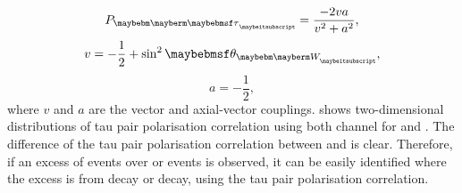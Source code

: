 \begin{equation}
P_{\Ptau} = \frac{-2va}{v^2 + a^2},
\end{equation}
\begin{equation}
v = -\frac{1}{2} + \sin^2{\theta_{\PW}},
\end{equation}
\begin{equation}
a = -\frac{1}{2},
\end{equation}
where $v$ and $a$ are the vector and axial-vector \ZTauTau couplings.  shows two-dimensional distributions of  tau pair polarisation correlation using both \tauToPion channel for \ZToTauTau and \HiggsToTauTau. The difference of the tau pair polarisation correlation between \PZ and \PHiggs  is clear. Therefore, if an excess of \TauTau events over \ee or \MuMu events is observed, it can be easily identified where the excess is from \PHiggs decay or \PZ decay, using the tau pair polarisation correlation.

